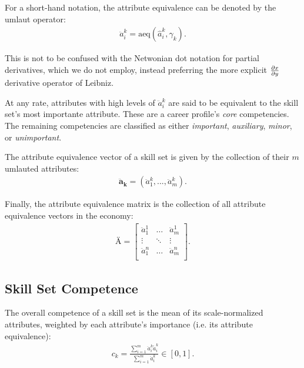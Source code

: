 \documentclass{elsarticle} %
\begin{document}
For a short-hand notation, the attribute equivalence can be denoted by the
umlaut operator:
\begin{gather}
    \ddot{a}_{i}^{k} = \text{aeq}(\hat{a}_{i}^{k}, \gamma_{k})
    .
\end{gather}

This is not to be confused with the Netwonian dot notation for partial
derivatives, which we do not employ, instead preferring the more explicit
$\partialderivative{x}{y}$ derivative operator of Leibniz.

At any rate, attributes with high levels of $\ddot{a}_{i}^{k}$ are said to be
equivalent to the skill set's most importante attribute. These are a career
profile's \textit{core} competencies. The remaining competencies are classified
as either \textit{important}, \textit{auxiliary}, \textit{minor}, or
\textit{unimportant}.

The attribute equivalence vector of a skill set is given by the collection of
their $m$ umlauted attributes:
\begin{gather}
    \boldsymbol{\ddot{a}_{k}} = (\ddot{a}_{1}^{k}, ..., \ddot{a}_{m}^{k})
    .
\end{gather}

Finally, the attribute equivalence matrix is the collection of all attribute
equivalence vectors in the economy:
\begin{gather}
    \textbf{Ä} =
    \begin{bmatrix}
        \ddot{a}_{1}^{1} & \hdots & \ddot{a}_{m}^{1} \\
        \vdots           & \ddots & \vdots           \\
        \ddot{a}_{1}^{n} & \hdots & \ddot{a}_{m}^{n} \\
    \end{bmatrix}
    .
\end{gather}

\subsection{Skill Set Competence}
The overall competence of a skill set is the mean of its scale-normalized
attributes, weighted by each attribute's importance (i.e. its attribute
equivalence):
\begin{gather}
    c_k =
    \frac{
    \sum_{i=1}^{m}{
    \ddot{a}_{i}^{k}
    \tilde{a}_{i}^{k}
    }
    }{
    \sum_{i=1}^{m}{
    \ddot{a}_{i}^{k}
    }
    }
    \in [0,1]
    .
\end{gather}
\end{document}
